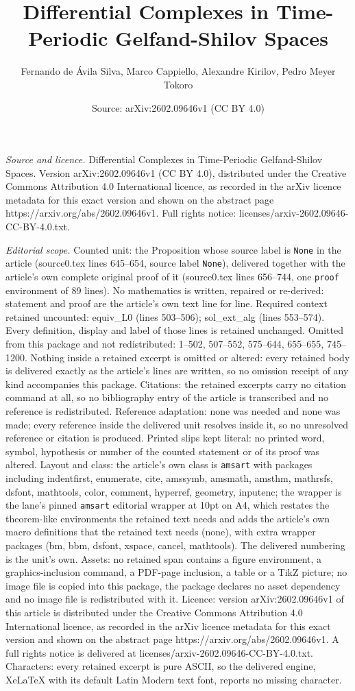 \documentclass[10pt,a4paper]{amsart}
\title[Differential Complexes in Time-Periodic Gelfand-Shilov Space]{Differential Complexes in Time-Periodic Gelfand-Shilov Spaces}
\author{Fernando de \'Avila Silva, Marco Cappiello, Alexandre Kirilov, Pedro Meyer Tokoro}
\date{Source: arXiv:2602.09646v1 (CC BY 4.0)}
\begin{document}
\maketitle

\noindent\emph{Source and licence.} Differential Complexes in Time-Periodic Gelfand-Shilov Spaces. Version arXiv:2602.09646v1 (CC BY 4.0), distributed under the Creative Commons Attribution 4.0 International licence, as recorded in the arXiv licence metadata for this exact version and shown on the abstract page https://arxiv.org/abs/2602.09646v1. Full rights notice: licenses/arxiv-2602.09646-CC-BY-4.0.txt.\par\smallskip

\noindent\textit{Editorial scope.} Counted unit: the Proposition whose source label is \texttt{None} in the article (source0.tex lines 645--654, source label \texttt{None}), delivered together with the article's own complete original proof of it (source0.tex lines 656--744, one \texttt{proof} environment of 89 lines). No mathematics is written, repaired or re-derived: statement and proof are the article's own text line for line. Required context retained uncounted: equiv\_L0 (lines 503--506); sol\_ext\_alg (lines 553--574). Every definition, display and label of those lines is retained unchanged. Omitted from this package and not redistributed: 1--502, 507--552, 575--644, 655--655, 745--1200. Nothing inside a retained excerpt is omitted or altered: every retained body is delivered exactly as the article's lines are written, so no omission receipt of any kind accompanies this package. Citations: the retained excerpts carry no citation command at all, so no bibliography entry of the article is transcribed and no reference is redistributed. Reference adaptation: none was needed and none was made; every reference inside the delivered unit resolves inside it, so no unresolved reference or citation is produced. Printed slips kept literal: no printed word, symbol, hypothesis or number of the counted statement or of its proof was altered. Layout and class: the article's own class is \texttt{amsart} with packages including indentfirst, enumerate, cite, amssymb, amsmath, amsthm, mathrsfs, dsfont, mathtools, color, comment, hyperref, geometry, inputenc; the wrapper is the lane's pinned \texttt{amsart} editorial wrapper at 10pt on A4, which restates the theorem-like environments the retained text needs and adds the article's own macro definitions that the retained text needs (none), with extra wrapper packages (bm, bbm, dsfont, xspace, cancel, mathtools). The delivered numbering is the unit's own. Assets: no retained span contains a figure environment, a graphics-inclusion command, a PDF-page inclusion, a table or a TikZ picture; no image file is copied into this package, the package declares no asset dependency and no image file is redistributed with it. Licence: version arXiv:2602.09646v1 of this article is distributed under the Creative Commons Attribution 4.0 International licence, as recorded in the arXiv licence metadata for this exact version and shown on the abstract page https://arxiv.org/abs/2602.09646v1. A full rights notice is delivered at licenses/arxiv-2602.09646-CC-BY-4.0.txt. Characters: every retained excerpt is pure ASCII, so the delivered engine, XeLaTeX with its default Latin Modern text font, reports no missing character.
\end{document}
